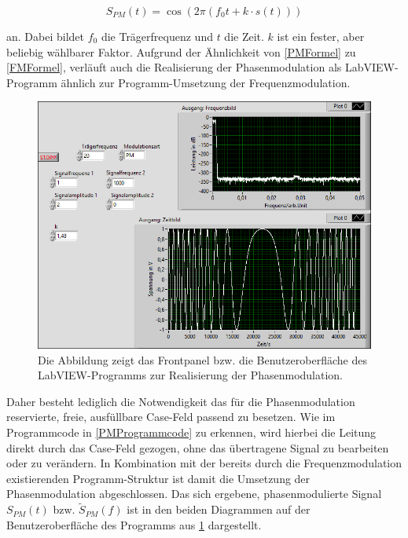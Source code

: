 \documentclass[
a4paper,
12pt,
pagesize,
ngerman
]{scrartcl}
\begin{document}
	\begin{equation} \label{PMFormel}
	S_{PM}(t) = \cos (2\pi (f_0 t + k \cdot s(t)))
	\end{equation}
	
	\noindent an. 
	Dabei bildet $f_0$ die Trägerfrequenz und $t$ die Zeit. 
	$k$ ist ein fester, aber beliebig wählbarer Faktor. 
	Aufgrund der Ähnlichkeit von \cref{PMFormel} zu \cref{FMFormel}, verläuft auch die Realisierung der Phasenmodulation als LabVIEW-Programm ähnlich zur Programm-Umsetzung der Frequenzmodulation. 
	
	\begin{figure}[H]
		\centering
		\includegraphics[width=1.0\textwidth]{EIRE2018Dateien/Tag4/FMPM-Erzeugung/PM-FMPM-Erzeugungp}
		\caption{Die Abbildung zeigt das Frontpanel bzw. die Benutzeroberfläche des LabVIEW-Programms zur Realisierung der Phasenmodulation.}
		\label{PMAusgabe}
	\end{figure}

	\noindent Daher besteht lediglich die Notwendigkeit das für die Phasenmodulation reservierte, freie, ausfüllbare Case-Feld passend zu besetzen. 
	Wie im Programmcode in \cref{PMProgrammcode} zu erkennen, wird hierbei die Leitung direkt durch das Case-Feld gezogen, ohne das übertragene Signal zu bearbeiten oder zu verändern. 
	In Kombination mit der bereits durch die Frequenzmodulation existierenden Programm-Struktur ist damit die Umsetzung der Phasenmodulation abgeschlossen. 
	Das sich ergebene, phasenmodulierte Signal $S_{PM}(t)$ bzw. $\tilde{S}_{PM}(f)$ ist in den beiden Diagrammen auf der Benutzeroberfläche des Programms aus \cref{PMAusgabe} dargestellt.
	
\end{document}
